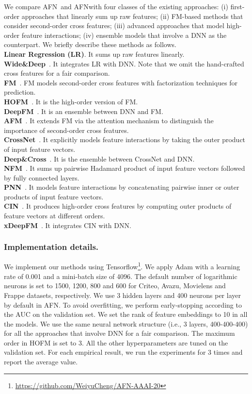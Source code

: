 \documentclass[letterpaper]{article} \usepackage{aaai20}  \usepackage{times}  \usepackage{helvet} \usepackage{courier}  \usepackage[hyphens]{url}  \usepackage{graphicx} \urlstyle{rm} \def\UrlFont{\rm}  \usepackage{graphicx}  \frenchspacing  \setlength{\pdfpagewidth}{8.5in}  \setlength{\pdfpageheight}{11in}
\newcommand{\model}{{AFN}~}
\newcommand{\modelns}{{AFN}}
\begin{document}
We compare \model and \modelns with four classes of the existing approaches: (i) first-order approaches that linearly sum up raw features; (ii) FM-based methods that consider second-order cross features; (iii) advanced approaches that model high-order feature interactions; (iv) ensemble models that involve a DNN as the counterpart. We briefly describe these methods as follows. \\
{ \bf Linear Regression (LR)}. It sums up raw features linearly. \\
{ \bf Wide\&Deep}~\cite{wide_and_deep}. It integrates LR with DNN. Note that we omit the hand-crafted cross features for a fair comparison.\\
{ \bf FM}~\cite{libFM}. FM models second-order cross features with factorization techniques for prediction. \\
{ \bf HOFM}~\cite{hofm}. It is the high-order version of FM.\\
{ \bf DeepFM}~\cite{DeepFM}. It is an ensemble between DNN and FM.\\
{ \bf AFM}~\cite{AFM}. It extends FM via the attention mechanism to distinguish the importance of second-order cross features. \\ 
{ \bf CrossNet}~\cite{deep_and_cross}. It explicitly models feature interactions by taking the outer product of input feature vectors.\\
{ \bf Deep\&Cross}~\cite{deep_and_cross}. It is the ensemble between CrossNet and DNN. \\
{ \bf NFM}~\cite{nfm}. It sums up pairwise Hadamard product of input feature vectors followed by fully connected layers. \\
{ \bf PNN}~\cite{pnn}. It models feature interactions by concatenating pairwise inner or outer products of input feature vectors. \\ 
{ \bf CIN}~\cite{xDeepFM}. It produces high-order cross features by computing outer products of feature vectors at different orders.\\
{ \bf xDeepFM}~\cite{xDeepFM}. It integrates CIN with DNN.
 
\subsubsection{Implementation details.}

We implement our methods using Tensorflow\footnote{\small\url{https://github.com/WeiyuCheng/AFN-AAAI-20}}. We apply Adam with a learning rate of 0.001 and a mini-batch size of 4096. The default number of logarithmic neurons is set to 1500, 1200, 800 and 600 for Criteo, Avazu, Movielens and Frappe datasets, respectively. We use 3 hidden layers and 400 neurons per layer by default in \modelns. To avoid overfitting, we perform early-stopping according to the AUC on the validation set. 
We set the rank of feature embeddings to 10 in all the models. We use the same neural network structure (i.e., 3 layers, 400-400-400) for all the approaches that involve DNN for a fair comparison. The maximum order in HOFM is set to 3. All the other hyperparameters are tuned on the validation set. For each empirical result, we run the experiments for 3 times and report the average value. 
\end{document}

